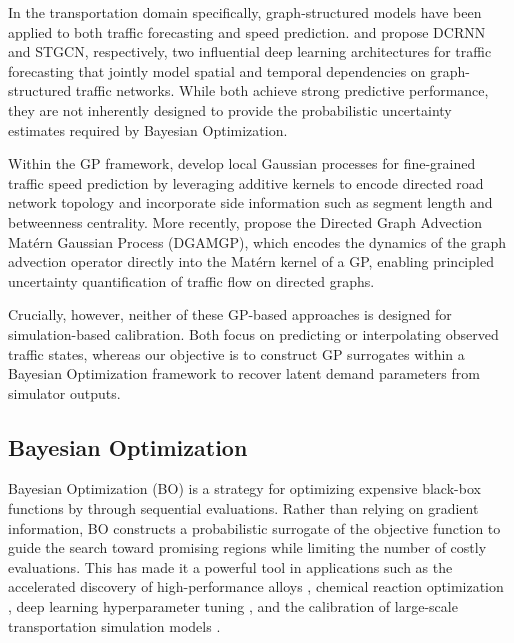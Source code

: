 \documentclass[11pt]{article}
\begin{document}
In the transportation domain specifically, graph-structured models 
have been applied to both traffic forecasting and speed prediction. 
\textcite{li2018dcrnn} and \textcite{yu2018stgcn}  propose DCRNN and STGCN, respectively, two influential deep learning architectures for traffic forecasting that jointly model spatial and temporal dependencies on graph-structured traffic networks. While both achieve strong predictive performance, they are not inherently designed to provide the probabilistic uncertainty estimates required by Bayesian Optimization.

 
 Within the GP framework, 
\textcite{le2017local} develop local Gaussian processes for fine-grained 
traffic speed prediction by leveraging additive kernels to encode directed 
road network topology and incorporate side information such as segment 
length and betweenness centrality. More recently, \textcite{maddix2022dgamgp} 
propose the Directed Graph Advection Matérn Gaussian Process (DGAMGP), 
which encodes the dynamics of the graph advection operator directly into the 
Matérn kernel of a GP, enabling principled uncertainty quantification of 
traffic flow on directed graphs. 



Crucially, however, neither of these GP-based approaches is designed for simulation-based calibration. Both focus on predicting or interpolating observed traffic states, whereas our objective is to construct GP surrogates within a Bayesian Optimization framework to recover latent demand parameters from simulator outputs.



\subsection{Bayesian Optimization}


Bayesian Optimization (BO) is a strategy for optimizing expensive black-box functions by through sequential evaluations. Rather than relying on gradient information, BO constructs a probabilistic surrogate of the objective function to guide the search toward promising regions while limiting the number of costly evaluations. This has made it a powerful tool in applications such as the accelerated discovery of high-performance alloys \parencite{xue2016accelerated}, chemical reaction optimization \parencite{shields2021bayesian}, deep learning hyperparameter tuning \parencite{snoek2012practical}, and the calibration of large-scale transportation simulation models \parencite{agriesti2023bayesian}.
\end{document}

